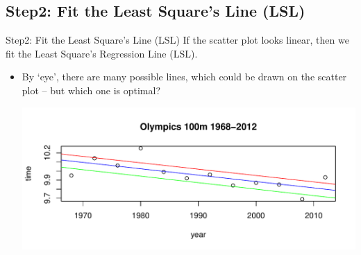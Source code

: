 \documentclass[t,xcolor=pdftex,dvipsnames,table]{beamer}\usepackage[]{graphicx}\usepackage[]{color}
\makeatletter
\def\maxwidth{ %
  \ifdim\Gin@nat@width>\linewidth
    \linewidth
  \else
    \Gin@nat@width
  \fi
}
\newenvironment{knitrout}{}{} %
\makeatother
\begin{document}
\subsection[]{Step2: Fit the Least Square’s Line (LSL)}
\begin{frame}[fragile]{Step2: Fit the Least Square’s Line (LSL)}
If the scatter plot looks linear, then we fit the Least Square’s Regression Line (LSL).

\begin{itemize}
\item By `eye’, there are many possible lines, which could be drawn on the scatter plot – but which one is optimal?

\begin{knitrout}
\color{fgcolor}
\includegraphics[width=\maxwidth]{figure/unnamed-chunk-45-1} 

\end{knitrout}
\end{itemize}
\end{frame}
\end{document}
